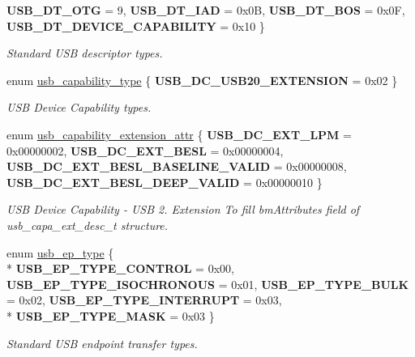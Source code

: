 \begin{DoxyCompactItemize}
{\bfseries U\-S\-B\-\_\-\-D\-T\-\_\-\-O\-T\-G} =  9, 
{\bfseries U\-S\-B\-\_\-\-D\-T\-\_\-\-I\-A\-D} =  0x0\-B, 
{\bfseries U\-S\-B\-\_\-\-D\-T\-\_\-\-B\-O\-S} =  0x0\-F, 
{\bfseries U\-S\-B\-\_\-\-D\-T\-\_\-\-D\-E\-V\-I\-C\-E\-\_\-\-C\-A\-P\-A\-B\-I\-L\-I\-T\-Y} =  0x10
 \}
\begin{DoxyCompactList}\small\item\em Standard U\-S\-B descriptor types. \end{DoxyCompactList}\item 
enum \hyperlink{group__usb__protocol__group_gab4eef94a7d2be2570193c4f9400a6fa6}{usb\-\_\-capability\-\_\-type} \{ {\bfseries U\-S\-B\-\_\-\-D\-C\-\_\-\-U\-S\-B20\-\_\-\-E\-X\-T\-E\-N\-S\-I\-O\-N} =  0x02
 \}
\begin{DoxyCompactList}\small\item\em U\-S\-B Device Capability types. \end{DoxyCompactList}\item 
enum \hyperlink{group__usb__protocol__group_ga4fa8bfac1cf05037ee2ef05aaa190299}{usb\-\_\-capability\-\_\-extension\-\_\-attr} \{ {\bfseries U\-S\-B\-\_\-\-D\-C\-\_\-\-E\-X\-T\-\_\-\-L\-P\-M} =  0x00000002, 
{\bfseries U\-S\-B\-\_\-\-D\-C\-\_\-\-E\-X\-T\-\_\-\-B\-E\-S\-L} =  0x00000004, 
{\bfseries U\-S\-B\-\_\-\-D\-C\-\_\-\-E\-X\-T\-\_\-\-B\-E\-S\-L\-\_\-\-B\-A\-S\-E\-L\-I\-N\-E\-\_\-\-V\-A\-L\-I\-D} =  0x00000008, 
{\bfseries U\-S\-B\-\_\-\-D\-C\-\_\-\-E\-X\-T\-\_\-\-B\-E\-S\-L\-\_\-\-D\-E\-E\-P\-\_\-\-V\-A\-L\-I\-D} =  0x00000010
 \}
\begin{DoxyCompactList}\small\item\em U\-S\-B Device Capability -\/ U\-S\-B 2. Extension To fill bm\-Attributes field of usb\-\_\-capa\-\_\-ext\-\_\-desc\-\_\-t structure. \end{DoxyCompactList}\item 
enum \hyperlink{group__usb__protocol__group_ga666def795a15032e5bf93a450f79113f}{usb\-\_\-ep\-\_\-type} \{ \\*
{\bfseries U\-S\-B\-\_\-\-E\-P\-\_\-\-T\-Y\-P\-E\-\_\-\-C\-O\-N\-T\-R\-O\-L} =  0x00, 
{\bfseries U\-S\-B\-\_\-\-E\-P\-\_\-\-T\-Y\-P\-E\-\_\-\-I\-S\-O\-C\-H\-R\-O\-N\-O\-U\-S} =  0x01, 
{\bfseries U\-S\-B\-\_\-\-E\-P\-\_\-\-T\-Y\-P\-E\-\_\-\-B\-U\-L\-K} =  0x02, 
{\bfseries U\-S\-B\-\_\-\-E\-P\-\_\-\-T\-Y\-P\-E\-\_\-\-I\-N\-T\-E\-R\-R\-U\-P\-T} =  0x03, 
\\*
{\bfseries U\-S\-B\-\_\-\-E\-P\-\_\-\-T\-Y\-P\-E\-\_\-\-M\-A\-S\-K} =  0x03
 \}
\begin{DoxyCompactList}\small\item\em Standard U\-S\-B endpoint transfer types. \end{DoxyCompactList}\item 

\end{DoxyCompactItemize}
